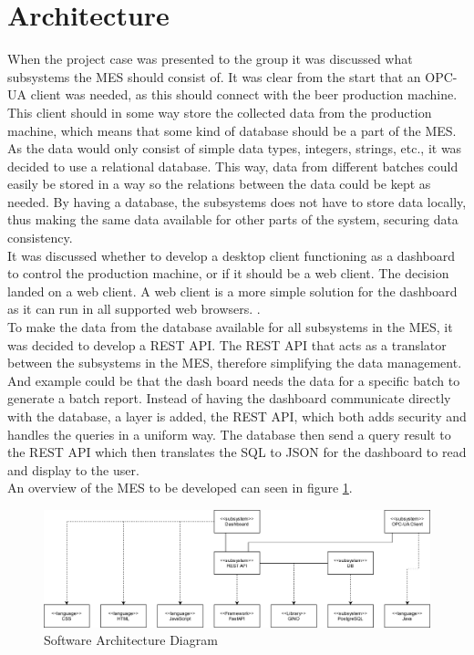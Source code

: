 \section{Architecture}
When the project case was presented to the group it was discussed what
subsystems the MES should consist of. It was clear from the start that an OPC-UA
client was needed, as this should connect with the beer production machine. This
client should in some way store the collected data from the production machine,
which means that some kind of database should be a part of the MES. As the data
would only consist of simple data types, integers, strings, etc., it was decided
to use a relational database. This way, data from different batches could easily
be stored in a way so the relations between the data could be kept as needed. By
having a database, the subsystems does not have to store data locally, thus
making the same data available for other parts of the system, securing data
consistency. \\

It was discussed whether to develop a desktop client functioning as a dashboard
to control the production machine, or if it should be a web client. The decision
landed on a web client. A web client is a more simple solution for the dashboard
as it can run in all supported web browsers. . \\

To make the data from the database available for all subsystems in the MES, 
it was decided to develop a REST API. The REST API that acts as a translator
between the subsystems in the MES, therefore simplifying the data management.
And example could be that the dash board needs the data for a specific batch to
generate a batch report. Instead of having the dashboard communicate directly
with the database, a layer is added, the REST API, which both adds security and
handles the queries in a uniform way. The database then send a query result to
the REST API which then translates the SQL to JSON for the dashboard to read
and display to the user. \\

An overview of the MES to be developed can seen in figure
\ref{figure:architucture_diagram}.

\begin{figure}[ht]
	\centering 
	\includegraphics[scale=0.24]{images/diagrams/architecture_diagram.png}
	\caption{Software Architecture Diagram}
	\label{figure:architucture_diagram} 
\end{figure}
